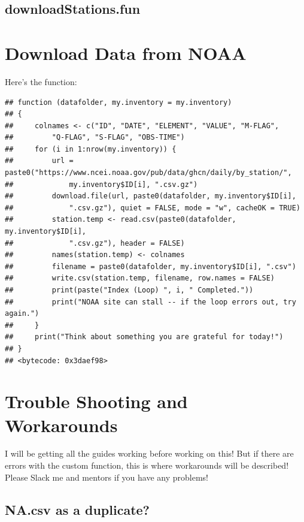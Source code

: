 \documentclass{article}\usepackage[]{graphicx}\usepackage[dvipsnames]{xcolor}
\makeatletter
\newenvironment{kframe}{%
 \def\at@end@of@kframe{}%
 \ifinner\ifhmode%
  \def\at@end@of@kframe{\end{minipage}}%
  \begin{minipage}{\columnwidth}%
 \fi\fi%
 \def\FrameCommand##1{\hskip\@totalleftmargin \hskip-\fboxsep
 \colorbox{shadecolor}{##1}\hskip-\fboxsep
     \hskip-\linewidth \hskip-\@totalleftmargin \hskip\columnwidth}%
 \MakeFramed {\advance\hsize-\width
   \@totalleftmargin\z@ \linewidth\hsize
   \@setminipage}}%
 {\par\unskip\endMakeFramed%
 \at@end@of@kframe}
\newenvironment{knitrout}{}{} %
\makeatother
\begin{document}
\subsection{downloadStations.fun}\label{subsec:downloadStations}\section{Download Data from NOAA}





Here's the function:

\begin{knitrout}
\color{fgcolor}\begin{kframe}
\begin{verbatim}
## function (datafolder, my.inventory = my.inventory) 
## {
##     colnames <- c("ID", "DATE", "ELEMENT", "VALUE", "M-FLAG", 
##         "Q-FLAG", "S-FLAG", "OBS-TIME")
##     for (i in 1:nrow(my.inventory)) {
##         url = paste0("https://www.ncei.noaa.gov/pub/data/ghcn/daily/by_station/", 
##             my.inventory$ID[i], ".csv.gz")
##         download.file(url, paste0(datafolder, my.inventory$ID[i], 
##             ".csv.gz"), quiet = FALSE, mode = "w", cacheOK = TRUE)
##         station.temp <- read.csv(paste0(datafolder, my.inventory$ID[i], 
##             ".csv.gz"), header = FALSE)
##         names(station.temp) <- colnames
##         filename = paste0(datafolder, my.inventory$ID[i], ".csv")
##         write.csv(station.temp, filename, row.names = FALSE)
##         print(paste("Index (Loop) ", i, " Completed."))
##         print("NOAA site can stall -- if the loop errors out, try again.")
##     }
##     print("Think about something you are grateful for today!")
## }
## <bytecode: 0x3daef98>
\end{verbatim}
\end{kframe}
\end{knitrout}

\section{Trouble Shooting and Workarounds}

I will be getting all the guides working before working on this! But if there are errors with the custom function, this is where workarounds will be described! Please Slack me and mentors if you have any problems!

\subsection{NA.csv as a duplicate?}
\end{document}
